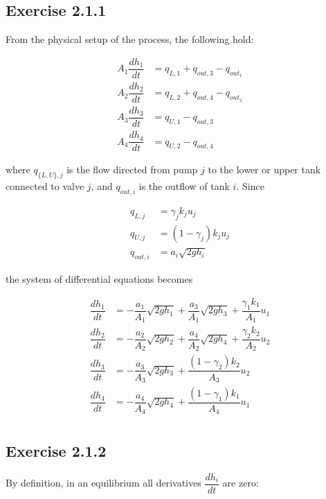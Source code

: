 \subsection*{Exercise 2.1.1}

From the physical setup of the process, the following hold:

\begin{align*}
  A_1\dfrac{dh_1}{dt} &= q_{L,1} + q_{out,3} - q_{out_1}  \\
  A_2\dfrac{dh_2}{dt} &= q_{L,2} + q_{out,4} - q_{out_2}  \\
  A_3\dfrac{dh_3}{dt} &= q_{U,1} - q_{out,3} \\
  A_4\dfrac{dh_4}{dt} &= q_{U,2} - q_{out,4}
\end{align*}

where $q_{\{L,U\}, j}$ is the flow directed from pump $j$ to the lower or upper
tank connected to valve $j$, and $q_{out,i}$ is the outflow of tank $i$. Since

\begin{align*}
  q_{L,j} &= \gamma_j k_j u_j  \\
  q_{U,j} &= (1-\gamma_j) k_j u_j  \\
  q_{out,i} &= a_i \sqrt{2gh_i}
\end{align*}

the system of differential equations becomes

\begin{align*}
  \dfrac{dh_1}{dt} &= -\dfrac{a_1}{A_1}\sqrt{2gh_1} + \dfrac{a_3}{A_1}\sqrt{2gh_3} + \dfrac{\gamma_1 k_1}{A_1}u_1 \\
  \dfrac{dh_2}{dt} &= -\dfrac{a_2}{A_2}\sqrt{2gh_2} + \dfrac{a_4}{A_2}\sqrt{2gh_4} + \dfrac{\gamma_2 k_2}{A_2}u_2 \\
  \dfrac{dh_3}{dt} &= -\dfrac{a_3}{A_3}\sqrt{2gh_3} + \dfrac{(1-\gamma_2)k_2}{A_3}u_2 \\
  \dfrac{dh_4}{dt} &= -\dfrac{a_4}{A_4}\sqrt{2gh_4} + \dfrac{(1-\gamma_1)k_1}{A_4}u_1 \\
\end{align*}



\subsection*{Exercise 2.1.2}

By definition, in an equilibrium all derivatives $\dfrac{dh_i}{dt}$ are zero:

